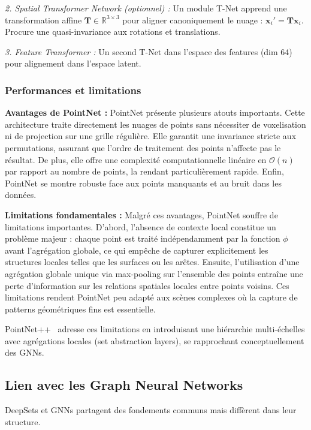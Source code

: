 \textit{2. Spatial Transformer Network (optionnel) :}
Un module T-Net apprend une transformation affine $\mathbf{T} \in \mathbb{R}^{3 \times 3}$ pour aligner canoniquement le nuage : $\mathbf{x}_i' = \mathbf{T}\mathbf{x}_i$. Procure une quasi-invariance aux rotations et translations.

\textit{3. Feature Transformer :}
Un second T-Net dans l'espace des features (dim 64) pour alignement dans l'espace latent.

\subsubsection{Performances et limitations}

\textbf{Avantages de PointNet :}
PointNet présente plusieurs atouts importants. Cette architecture traite directement les nuages de points sans nécessiter de voxelisation ni de projection sur une grille régulière. Elle garantit une invariance stricte aux permutations, assurant que l'ordre de traitement des points n'affecte pas le résultat. De plus, elle offre une complexité computationnelle linéaire en $\mathcal{O}(n)$ par rapport au nombre de points, la rendant particulièrement rapide. Enfin, PointNet se montre robuste face aux points manquants et au bruit dans les données.

\textbf{Limitations fondamentales :}
Malgré ces avantages, PointNet souffre de limitations importantes. D'abord, l'absence de contexte local constitue un problème majeur : chaque point est traité indépendamment par la fonction $\phi$ avant l'agrégation globale, ce qui empêche de capturer explicitement les structures locales telles que les surfaces ou les arêtes. Ensuite, l'utilisation d'une agrégation globale unique via max-pooling sur l'ensemble des points entraîne une perte d'information sur les relations spatiales locales entre points voisins. Ces limitations rendent PointNet peu adapté aux scènes complexes où la capture de patterns géométriques fins est essentielle.

PointNet++~\cite{Qi2017b} adresse ces limitations en introduisant une hiérarchie multi-échelles avec agrégations locales (set abstraction layers), se rapprochant conceptuellement des GNNs.

\subsection{Lien avec les Graph Neural Networks}

DeepSets et GNNs partagent des fondements communs mais diffèrent dans leur structure.

